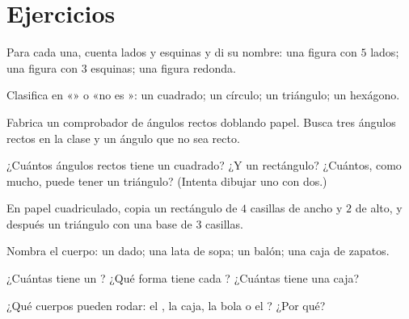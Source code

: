 \section{Ejercicios}

\begin{exercise}[$\star$]\label{exo:g2:shapes:1}
Para cada una, cuenta lados y esquinas y di su nombre: una figura con $5$
lados; una figura con $3$ esquinas; una figura redonda.
\end{exercise}

\begin{exercise}[$\star$]\label{exo:g2:shapes:2}
Clasifica en «» o «no es »: un cuadrado; un círculo; un
triángulo; un hexágono.
\end{exercise}

\begin{exercise}[$\star$]\label{exo:g2:shapes:3}
Fabrica un comprobador de ángulos rectos doblando papel. Busca tres ángulos rectos
en la clase y un ángulo que no sea recto.
\end{exercise}

\begin{exercise}[$\star$]\label{exo:g2:shapes:4}
¿Cuántos ángulos rectos tiene un cuadrado? ¿Y un rectángulo? ¿Cuántos, como mucho,
puede tener un triángulo? (Intenta dibujar uno con dos.)
\end{exercise}

\begin{exercise}[$\star$]\label{exo:g2:shapes:5}
En papel cuadriculado, copia un rectángulo de $4$ casillas de ancho y $2$
de alto, y después un triángulo con una base de $3$ casillas.
\end{exercise}

\begin{exercise}[$\star$]\label{exo:g2:shapes:6}
Nombra el cuerpo: un dado; una lata de sopa; un balón; una caja de zapatos.
\end{exercise}

\begin{exercise}[$\star$]\label{exo:g2:shapes:7}
¿Cuántas  tiene un ? ¿Qué forma tiene cada ? ¿Cuántas 
tiene una caja?
\end{exercise}

\begin{exercise}[$\star$]\label{exo:g2:shapes:8}
¿Qué cuerpos pueden rodar: el , la caja, la bola o el ?
¿Por qué?
\end{exercise}

